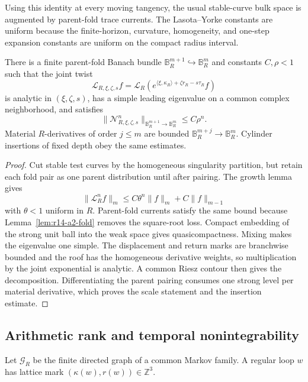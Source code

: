 Using this identity at every moving tangency, the usual stable-curve bulk
space is augmented by parent-fold trace currents.  The Lasota--Yorke
constants are uniform because the finite-horizon, curvature, homogeneity, and
one-step expansion constants are uniform on the compact radius interval.

\begin{theorem}
\label{thm:r14-a2-bundle}
There is a finite parent-fold Banach bundle
\(\mathbb B_R^{m+1}\hookrightarrow\mathbb B_R^m\) and constants
\(C,\rho<1\) such that the joint twist
\[
 \mathcal L_{R,\xi,\zeta,s}f
 =
 \mathcal L_R
 \left(e^{\langle\xi,\kappa_R\rangle+\zeta r_R-s\tau_R}f\right)
\]
is analytic in \((\xi,\zeta,s)\), has a simple leading eigenvalue on a common
complex neighborhood, and satisfies
\[
 \|\mathcal N_{R,\xi,\zeta,s}^n\|_{\mathbb B_R^{m+1}\to\mathbb B_R^m}
 \le C\rho^n .
\]
Material \(R\)-derivatives of order \(j\le m\) are bounded
\(\mathbb B_R^{m+j}\to\mathbb B_R^m\).  Cylinder insertions of fixed depth
obey the same estimates.
\end{theorem}

\begin{proof}
Cut stable test curves by the homogeneous singularity partition, but retain
each fold pair as one parent distribution until after pairing.  The growth
lemma gives
\[
 \|\mathcal L_R^nf\|_{m}
 \le C\theta^n\|f\|_{m}+C\|f\|_{m-1}
\]
with \(\theta<1\) uniform in \(R\).  Parent-fold currents satisfy the same
bound because Lemma~\ref{lem:r14-a2-fold} removes the square-root loss.
Compact embedding of the strong unit ball into the weak space gives
quasicompactness.  Mixing makes the eigenvalue one simple.  The displacement
and return marks are branchwise bounded and the roof has the homogeneous
derivative weights, so multiplication by the joint exponential is analytic.
A common Riesz contour then gives the decomposition.  Differentiating the
parent pairing consumes one strong level per material derivative, which
proves the scale statement and the insertion estimate.
\end{proof}

\subsection{Arithmetic rank and temporal nonintegrability}

Let \(\mathcal G_R\) be the finite directed graph of a common Markov family.
A regular loop \(w\) has lattice mark
\((\kappa(w),r(w))\in\mathbb Z^3\).

